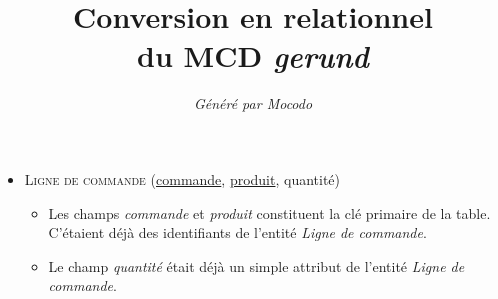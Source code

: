 \documentclass[a4paper]{article}
\title{Conversion en relationnel\\du MCD \emph{gerund}}
\author{\emph{Généré par Mocodo}}
\newcommand{\relat}[1]{\textsc{#1}}
\newcommand{\attr}[1]{#1}
\newcommand{\prim}[1]{\uline{#1}}
\begin{document}
\maketitle

\begin{itemize}
  \item \relat{Ligne de commande} (\prim{commande}, \prim{produit}, \attr{quantité})
  \begin{itemize}
    \item Les champs \emph{commande} et \emph{produit} constituent la clé primaire de la table. C'étaient déjà des identifiants de l'entité \emph{Ligne de commande}.
    \item Le champ \emph{quantité} était déjà un simple attribut de l'entité \emph{Ligne de commande}.
  \end{itemize}

\end{itemize}
\end{document}

